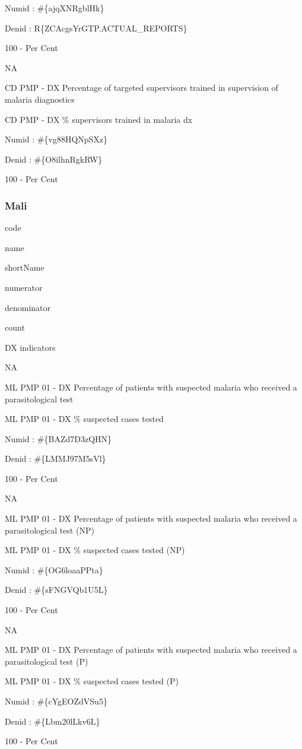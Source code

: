 \documentclass[]{book}
\begin{document}
Numid : \#\{ajqXNRgblHk\}

Denid : R\{ZCAcgsYrGTP.ACTUAL\_REPORTS\}

100 - Per Cent

NA

CD PMP - DX Percentage of targeted supervisors trained in supervision of malaria diagnostics

CD PMP - DX \% supervisors trained in malaria dx

Numid : \#\{vg88HQNpSXz\}

Denid : \#\{O8ilhnRgkRW\}

100 - Per Cent

\hypertarget{mali}{%
\subsubsection{Mali}\label{mali}}

code

name

shortName

numerator

denominator

count

DX indicators

NA

ML PMP 01 - DX Percentage of patients with suspected malaria who received a parasitological test

ML PMP 01 - DX \% suspected cases tested

Numid : \#\{BAZd7D3zQHN\}

Denid : \#\{LMMJ97M5sVl\}

100 - Per Cent

NA

ML PMP 01 - DX Percentage of patients with suspected malaria who received a parasitological test (NP)

ML PMP 01 - DX \% suspected cases tested (NP)

Numid : \#\{OG6loaaPPta\}

Denid : \#\{sFNGVQb1U5L\}

100 - Per Cent

NA

ML PMP 01 - DX Percentage of patients with suspected malaria who received a parasitological test (P)

ML PMP 01 - DX \% suspected cases tested (P)

Numid : \#\{cYgEOZdVSu5\}

Denid : \#\{Lbm20lLkv6L\}

100 - Per Cent
\end{document}
